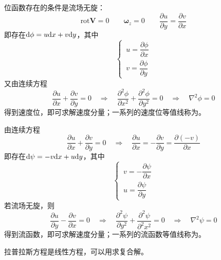 位函数存在的条件是流场无旋：
\begin{equation*}
	\text{rot} \bm{V} = 0 \qquad \bm{\omega}_z = 0 \qquad \dfrac{\partial u}{\partial y} = \dfrac{\partial v}{\partial x}
\end{equation*}
即存在${\rm{d}} \phi = u {\rm{d}} x + v {\rm{d}} y$，其中
\begin{equation}
	\begin{cases}
		\, u = \dfrac{\partial \phi}{\partial x} \\[0.5em]
		\, v = \dfrac{\partial \phi}{\partial y}
	\end{cases}
\end{equation}
又由连续方程
\begin{equation}
	\dfrac{\partial u}{\partial x} + \dfrac{\partial v}{\partial y} = 0 \quad \Rightarrow \quad \dfrac{\partial^2 \phi}{\partial x^2} + \dfrac{\partial^2 \phi}{\partial y^2} = 0 \quad \Rightarrow \quad \nabla^2 \phi = 0
\end{equation}
得到速度位，即可求解速度分量；一系列的速度位等值线称为。
\vspace*{1em}

\sssection[流函数]

由连续方程
\begin{equation*}
	\dfrac{\partial u}{\partial x} + \dfrac{\partial v}{\partial y} = 0 \quad \Rightarrow \quad \dfrac{\partial u}{\partial x} = -\dfrac{\partial v}{\partial y} = \dfrac{\partial (-v)}{\partial x}
\end{equation*}
即存在${\rm{d}} \psi = -v {\rm{d}} x + u {\rm{d}} y$，其中
\begin{equation}
	\begin{cases}
		\, v = -\dfrac{\partial \psi}{\partial x} \\[0.5em]
		\, u = \dfrac{\partial \psi}{\partial y}
	\end{cases}
\end{equation}
若流场无旋，则
\begin{equation}
	\dfrac{\partial u}{\partial y} - \dfrac{\partial v}{\partial x} = 0 \quad \Rightarrow \quad  \dfrac{\partial^2 \psi}{\partial y^2} + \dfrac{\partial^2 \psi}{\partial^2 x^2} = 0 \quad \Rightarrow \quad \nabla^2 \psi = 0
\end{equation}
得到流函数，即可求解速度分量；一系列的流函数等值线称为。
\vspace*{1em}

\sssection[叠加原理]

拉普拉斯方程是线性方程，可以用求复合解。

